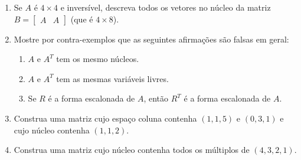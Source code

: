 \documentclass[leqno]{article}
\numberwithin{equation}{section}
\begin{document}
\begin{enumerate}
\begin{enumerate}
        \end{enumerate}

    \item Se $A$ é $4\times 4$ e inversível, descreva todos os vetores no núcleo da matriz $B = \begin{bmatrix}A & A \end{bmatrix}$ (que é $4\times 8$).
    
    \begin{sol} 
    \end{sol} 

    \item Mostre por contra-exemplos que as seguintes afirmações são falsas em geral:

        \begin{enumerate}

            \item $A$ e $A^T$ tem os mesmo núcleos.
	    
	    \begin{sol} 
	    \end{sol} 

            \item $A$ e $A^T$ tem as mesmas variáveis livres.
	    
	    \begin{sol} 
	    \end{sol} 

            \item Se $R$ é a forma escalonada de $A$, então $R^T$ é a forma escalonada de $A$.
	    
	    \begin{sol} 
	    \end{sol} 
        \end{enumerate}

    \item Construa uma matriz cujo espaço coluna contenha $(1,1,5)$ e $(0,3,1)$ e cujo núcleo contenha $(1,1,2)$.

    \begin{sol} 
    \end{sol} 

    \item Construa uma matriz cujo núcleo contenha todos os múltiplos de $(4,3,2,1)$.
    
    \begin{sol} 
    \end{sol} 


\end{enumerate}
\end{document}
